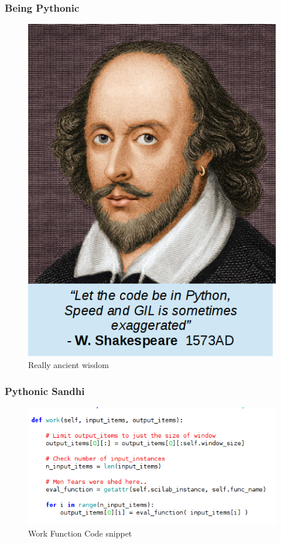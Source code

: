 \documentclass{beamer}
\begin{document}
\begin{frame}
    \frametitle{Being Pythonic}

    \begin{figure}
        \centering
        \begin{minipage}{.5\textwidth}
            \centering
            \includegraphics[width=.9\linewidth]{my_img/shaku2.png}
            \caption{Really ancient wisdom}
        \end{minipage}%
    \end{figure}

\end{frame}

\begin{frame}
        \frametitle{Pythonic Sandhi}
    \begin{figure}
        \centering
        \begin{minipage}{.5\textwidth}
            \centering
            \includegraphics[width=.9\linewidth]{my_img/wf_code_snipped.png}
            \caption{Work Function Code snippet}
        \end{minipage}%
    \end{figure}

\end{frame}
\end{document}
